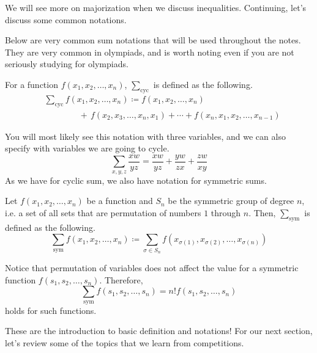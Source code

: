 \documentclass[../../main.tex]{subfiles}
\begin{document}
We will see more on majorization when we discuss inequalities.
Continuing, let's discuss some common notations.

Below are very common sum notations that will be used throughout
the notes. They are very common in olympiads, and is worth noting
even if you are not seriously studying for olympiads.

\begin{definition}{}{}
For a function $f(x_1, x_2, \ldots, x_n)$, $\sum_\text{cyc}$ is
defined as the following.
\vspace{-0.5\baselineskip}
\begin{align*}
    &\sum_\text{cyc} f(x_1, x_2, \ldots, x_n)
    \coloneqq f(x_1, x_2, \ldots, x_n) \\[-0.8em]
    &\qquad\qquad + \, f(x_2, x_3, \ldots, x_n, x_1) +
        \cdots + f(x_n, x_1, x_2, \ldots, x_{n-1})
\end{align*}
\end{definition}

You will most likely see this notation with three variables, and
we can also specify with variables we are going to cycle.
\[
\sum_{x,y,z} \frac{xw}{yz}
= \frac{xw}{yz} + \frac{yw}{zx} + \frac{zw}{xy}
\]
As we have for cyclic sum, we also have notation for symmetric sums.

\begin{definition}{}{}
Let $f(x_1, x_2, \ldots, x_n)$ be a function and $S_n$ be the
symmetric group of degree $n$, i.e. a set of all sets that are
permutation of numbers $1$ through $n$. Then, $\sum_\text{sym}$ is
defined as the following.
\[
\sum_\text{sym} f(x_1, x_2, \ldots, x_n)
\coloneqq \sum_{\sigma \in S_n}
    f(x_{\sigma(1)}, x_{\sigma(2)}, \ldots, x_{\sigma(n)})
\]
\end{definition}

Notice that permutation of variables does not affect the value for
a symmetric function $f(s_1, s_2, \ldots, s_n)$. Therefore,
\[
\sum_\text{sym} f(s_1, s_2, \ldots, s_n)
= n! f(s_1, s_2, \ldots, s_n)
\]
holds for such functions.

These are the introduction to basic definition and notations!
For our next section, let's review some of the topics that we
learn from competitions.
\end{document}
